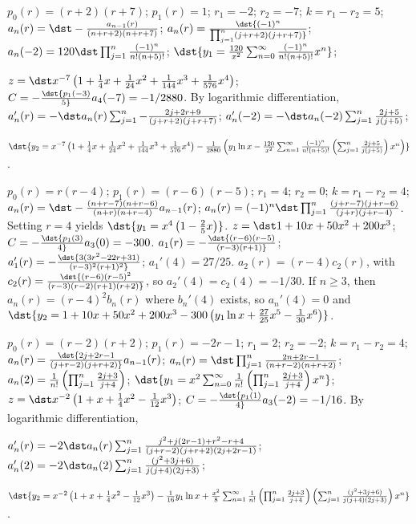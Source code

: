\documentclass[dvips]{book}
\renewcommand{\exer}[1]{\par\medskip\;\noindent{\color{red}\bf #1.}}
\numberwithin{example}{section}
\numberwithin{equation}{section}
\numberwithin{theorem}{section}
\numberwithin{table}{section}
\numberwithin{figure}{section}
\begin{document}
\exer{7.7.8}
$p_0(r)=(r+2)(r+7)$;
$p_1(r)=1$;
$r_1=-2$; $r_2=-7$; $k=r_1-r_2=5$;
$a_n(r)=\dst-{a_{n-1}(r)\over(n+r+2)(n+r+7)}$;
$a_n(r)=\dst{(-1)^n\over\prod_{j=1}^n(j+r+2)(j+r+7)}$;
$a_n(-2)=120\dst\prod_{j=1}^n{(-1)^n\over n!(n+5)!}$;
$\dst{y_1={120\over x^2}\sum_{n=0}^\infty{(-1)^n\over
n!(n+5)!}x^n}$;

$z=\dst
x^{-7}\left(1+{1\over4}x+{1\over24}x^2+{1\over144}x^3
+{1\over576}x^4\right)$;
$C=-\dst{p_1(-3)\over5}a_4(-7)=-1/2880$.
By logarithmic differentiation,
$a_n'(r)=-\dst a_n(r)\sum_{j=1}^n-{2j+2r+9\over(j+r+2)(j+r+7)}$;
$a_n'(-2)=-\dst a_n(-2)\sum_{j=1}^n{2j+5\over j(j+5)}$;

$\dst{y_2=x^{-7}\left(1+{1\over4}x+{1\over24}x^2+{1\over144}x^3
+{1\over576}x^4\right)-{1\over2880}\left(y_1\ln x-{120\over x^2}
\sum_{n=1}^\infty{(-1)^n\over
n!(n+5)!}\left(\sum_{j=1}^n{2j+5\over j(j+5)}\right)x^n\right)}$.


\exer{7.7.10}
$p_0(r)=r(r-4)$;
$p_1(r)=(r-6)(r-5)$;
$r_1=4$; $r_2=0$; $k=r_1-r_2=4$;
$a_n(r)=\dst
-{(n+r-7)(n+r-6)\over(n+r)(n+r-4)}
a_{n-1}(r)$;
 $a_n(r)=(-1)^n\dst\prod_{j=1}^n{(j+r-7)(j+r-6)\over(j+r)(j+r-4)}$.
Setting $r=4$ yields
$\dst{y_1=x^4\left(1-{2\over5}x\right)}$.
$z=\dst1+10x+50x^2+200x^3$;
$C=-\dst{p_1(3)\over 4}a_3(0)=-300$.
$a_1(r)=-\dst{(r-6)(r-5)\over(r-3)(r+1)}$;
$a_1'(r)=-\dst{3(3r^2-22r+31)\over(r-3)^2(r+1)^2}$;
$a_1'(4)=27/25$.
$a_2(r)=(r-4)c_2(r)$, with
$c_2(r)=\dst{(r-6)(r-5)^2\over(r-3)(r-2)(r+1)(r+2)}$, so
$a_2'(4)=c_2(4)=-1/30$.
If $n\ge3$, then $a_n(r)=(r-4)^2b_n(r)$ where $b_n'(4)$ exists, so
$a_n'(4)=0$  and
$\dst{y_2=1+10x+50x^2+200x^3-300\left(y_1\ln
x+{27\over25}x^5-{1\over30}x^6\right)}$.


\exer{7.7.12}
$p_0(r)=(r-2)(r+2)$;
$p_1(r)=-2r-1$;
$r_1=2$; $r_2=-2$; $k=r_1-r_2=4$;
$a_n(r)=\dst{2j+2r-1\over(j+r-2)(j+r+2)}
a_{n-1}(r)$;
 $a_n(r)=\dst\prod_{j=1}^n{2n+2r-1\over(n+r-2)(n+r+2)}$;
$a_n(2)={1\over n!}\left(\prod_{j=1}^n{2j+3\over j+4}\right)$;
$\dst{y_1=x^2\sum_{n=0}^\infty{1\over n!}\left(\prod_{j=1}^n{2j+3\over
j+4}\right)x^n}$;
$z=\dst x^{-2}\left(1+x+{1\over4}x^2-{1\over12}x^3\right)$;
$C=-\dst{p_1(1)\over 4}a_3(-2)=-1/16$.
By logarithmic differentiation,

$a_n'(r)=-2\dst a_n(r)\sum_{j=1}^n
{j^2+j(2r-1)+r^2-r+4\over(j+r-2)(j+r+2)(2j+2r-1)}$;
$a_n'(2)=-2\dst a_n(2)\sum_{j=1}^n{(j^2+3j+6)\over
j(j+4)(2j+3)}$;

$\dst{y_2=x^{-2}\left(1+x+{1\over4}x^2-{1\over12}x^3\right)-{1\over16}
y_1\ln x+ {x^2\over8}\sum_{n=1}^\infty{1\over
n!}\left(\prod_{j=1}^n{2j+3\over j+4}
\right)\left(\sum_{j=1}^n{(j^2+3j+6)\over j(j+4)(2j+3)}\right)x^n}$.
\end{document}
